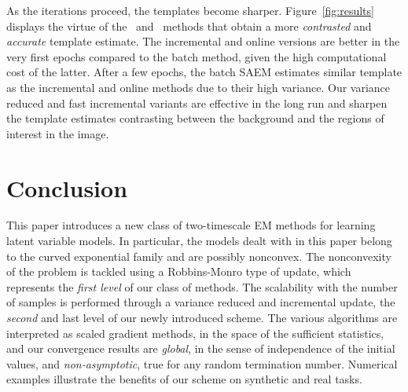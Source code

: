 \documentclass[conference,letterpaper]{IEEEtran}
\begin{document}
As the iterations proceed, the templates become sharper.
Figure~\ref{fig:results} displays the virtue of the \SAEMVR\ and \FISAEM\ methods that obtain a more \textit{contrasted} and \textit{accurate} template estimate. 
The incremental and online versions are better in the very first epochs compared to the batch method, given the high computational cost of the latter. 
After a few epochs, the batch SAEM estimates similar template as the incremental and online methods due to their high variance. 
Our variance reduced and fast incremental variants are effective in the long run and sharpen the template estimates contrasting between the background and the regions of interest in the image.




\section{Conclusion}


This paper introduces a new class of two-timescale EM methods for learning latent variable models.
In particular, the models dealt with in this paper belong to the curved exponential family and are possibly nonconvex.
The nonconvexity of the problem is tackled using a Robbins-Monro type of update, which represents the \textit{first level} of our class of methods.
The scalability with the number of samples is performed through a variance reduced and incremental update, the \textit{second} and last level of our newly introduced scheme.
The various algorithms are interpreted as scaled gradient methods, in the space of the sufficient statistics, and our convergence results are \emph{global}, in the sense of independence of the initial values, and \emph{non-asymptotic}, \ie true for any random termination number.
Numerical examples illustrate the benefits of our scheme on synthetic and real tasks.




%
\end{document}
